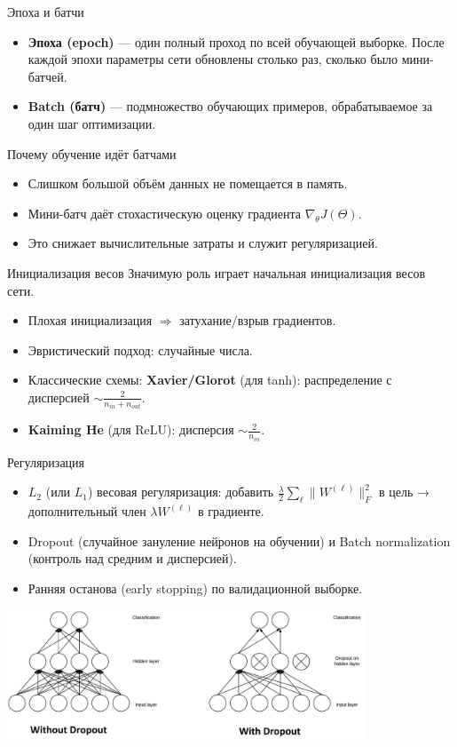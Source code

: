 \documentclass[notheorems, handout]{beamer}
\begin{document}
\begin{frame}{Эпоха и батчи}
  \begin{itemize}
    \item \textbf{Эпоха (epoch)} --- один полный проход по всей обучающей выборке. 
      После каждой эпохи параметры сети обновлены столько раз, сколько было мини-батчей.

    \item \textbf{Batch (батч)} --- подмножество обучающих примеров, обрабатываемое за один шаг оптимизации. 
  \end{itemize}

\begin{block}{Почему обучение идёт батчами}
  \begin{itemize}
    \item Слишком большой объём данных не помещается в память.
    \item Мини-батч даёт стохастическую оценку градиента $\nabla_\theta J(\Theta)$.
    \item Это снижает вычислительные затраты и служит регуляризацией.
  \end{itemize}
\end{block}
\end{frame}
\begin{frame}{Инициализация весов}
Значимую роль играет начальная инициализация весов сети.
  \begin{itemize}
    \item Плохая инициализация $\Rightarrow$ затухание/взрыв градиентов.
    \item Эвристический подход: случайные числа.
    \item Классические схемы: \textbf{Xavier/Glorot} (для tanh): распределение с дисперсией $\sim\frac{2}{n_{in}+n_{out}}$.
    \item \textbf{Kaiming He} (для ReLU): дисперсия $\sim\frac{2}{n_{in}}$.
  \end{itemize}
\end{frame}

\begin{frame}{Регуляризация}
  \begin{itemize}
    \item $L_2$ (или $L_1$) весовая регуляризация: добавить $\frac{\lambda}{2}\sum_\ell \|W^{(\ell)}\|_F^2$ в цель → дополнительный член $\lambda W^{(\ell)}$ в градиенте.
    \item Dropout (случайное зануление нейронов на обучении) и Batch normalization (контроль над средним и дисперсией).
    \item Ранняя останова (early stopping) по валидационной выборке.
  \end{itemize}
  
    \centering
          \includegraphics[width=0.8\textwidth]{img/dropout.png}
\end{frame}
\end{document}
